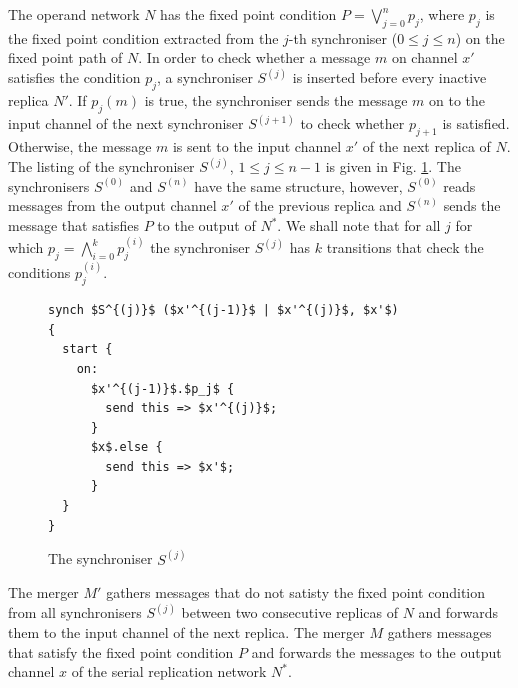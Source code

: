 The operand network $N$ has the fixed point condition $P = \bigvee_{j=0}^{n} p_j$, where $p_j$ is the fixed point condition extracted from the $j$-th synchroniser ($0 \leq j \leq n$) on the fixed point path of $N$. In order to check whether a message $m$ on channel $x'$ satisfies the condition $p_j$, a synchroniser $S^{(j)}$ is inserted before every inactive replica $N'$. If $p_{j}(m)$ is true, the synchroniser sends the message $m$ on to the input channel of the next synchroniser $S^{(j+1)}$ to check whether $p_{j+1}$ is satisfied. Otherwise, the message $m$ is sent to the input channel $x'$ of the next replica of $N$. The listing of the synchroniser $S^{(j)}$, $1 \leq j \leq n-1$ is given in Fig. \ref{ffp:synch_filt}. The synchronisers $S^{(0)}$ and $S^{(n)}$ have the same structure, however, $S^{(0)}$ reads messages from the output channel $x'$ of the previous replica and $S^{(n)}$ sends the message that satisfies $P$ to the output of $N^{*}$. We shall note that for all $j$ for which $p_j = \bigwedge_{i=0}^{k}p^{(i)}_j$ the synchroniser $S^{(j)}$ has $k$ transitions that check the conditions $p^{(i)}_j$.
\begin{figure}[h!]
\begin{lstlisting}[frame=single,mathescape]
synch $S^{(j)}$ ($x'^{(j-1)}$ | $x'^{(j)}$, $x'$)
{
  start {
    on:
      $x'^{(j-1)}$.$p_j$ {
        send this => $x'^{(j)}$;
      }
      $x$.else {
        send this => $x'$;
      }
  }
}
\end{lstlisting}
\caption{The synchroniser $S^{(j)}$}
\label{ffp:synch_filt}
\end{figure}

The merger $M'$ gathers messages that do not satisty the fixed point condition from all synchronisers $S^{(j)}$ between two consecutive replicas of $N$ and forwards them to the input channel of the next replica. The merger $M$ gathers messages that satisfy the fixed point condition $P$ and forwards the messages to the output channel $x$ of the serial replication network $N^{*}$.


